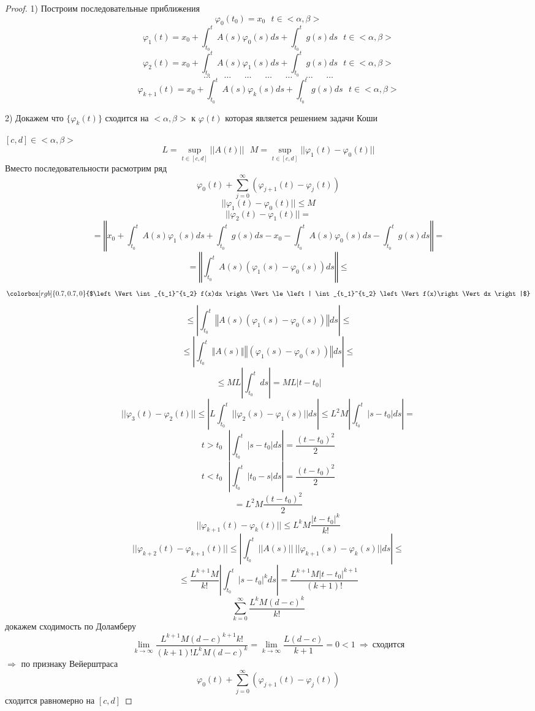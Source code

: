 \begin{proof}
  1) Построим последовательные приближения
  $$
  \varphi_0(t_0) = x_0 ~~~ t \in <\alpha, \beta>
  $$
  $$
  \varphi_1(t) = x_0 + \int_{t_0}^t A(s) \varphi_0(s)ds + \int_{t_0}^t g(s) ds
  ~~~ t \in <\alpha, \beta>
  $$
  $$
  \varphi_2(t) = x_0 + \int_{t_0}^t A(s) \varphi_1(s)ds + \int_{t_0}^t g(s) ds
  ~~~ t \in <\alpha, \beta>
  $$
  $$
  \ldots ~~~~~~~ \ldots ~~~~~~~ \ldots ~~~~~~~ \ldots ~~~~~~~ \ldots
   ~~~~~~~ \ldots ~~~~~~~ \ldots
  $$
  $$
  \varphi_{k+1}(t) = x_0 + \int_{t_0}^t A(s) \varphi_k(s)ds +
  \int_{t_0}^t g(s)ds ~~~ t \in <\alpha, \beta>
  $$

  2) Докажем что $\{\varphi_k(t)\}$ сходится на $<\alpha, \beta>$ к
  $\varphi(t)$ которая является решением задачи Коши

  $[c,d] \in <\alpha, \beta>$
  $$
  L = \sup_{t \in [c,d]} ||A(t)|| ~~~ M = \sup_{t \in [c,d]} ||\varphi_1(t) -
  \varphi_0(t)||
  $$
  Вместо последовательности расмотрим ряд
  $$
  \varphi_0(t) + \sum_{j=0}^{\infty}(\varphi_{j+1}(t) - \varphi_j(t))
  $$
  $$
  ||\varphi_1(t) - \varphi_0(t)|| \le M
  $$
  $$
  ||\varphi_2(t) - \varphi_1(t)|| =
  $$
  $$
  = \left\Vert x_0 + \int_{t_0}^t A(s)\varphi_1(s)ds +
  \int_{t_0}^t g(s)ds - x_0 - \int_{t_0}^t A(s)\varphi_0(s)ds -
  \int_{t_0}^t g(s)ds\right\Vert =
  $$
  $$
  = \left\Vert \int_{t_0}^t A(s)(\varphi_1(s) - \varphi_0(s))ds\right\Vert \le
  $$
  $$
  \colorbox[rgb]{0.7,0.7,0}{$\left\Vert \int_{t_1}^{t_2} f(x)dx \right\Vert
  \le \left| \int_{t_1}^{t_2} \left\Vert f(x)\right\Vert dx \right|$}
  $$
  $$
  \le \left| \int_{t_0}^t \left\Vert A(s)(\varphi_1(s) - \varphi_0(s))
  \right\Vert ds \right| \le
  $$
  $$
  \le \left| \int_{t_0}^t \left\Vert A(s)\right\Vert
  \left\Vert (\varphi_1(s) - \varphi_0(s)) \right\Vert ds \right| \le
  $$
  $$
  \le ML \left| \int_{t_0}^{t} ds \right| = ML|t-t_0|
  $$
  $$
  ||\varphi_3(t) - \varphi_2(t)|| \le \left| L \int_{t_0}^t||\varphi_2(s) -
  \varphi_1(s)||ds \right| \le L^2 M \left| \int_{t_0}^t |s - t_0| ds \right| =
  $$
  $$
  t > t_0 ~~~ \left| \int_{t_0}^t |s - t_0| ds \right| = \frac{(t- t_0)^2}{2}
  $$
  $$
  t < t_0 ~~~ \left| \int_{t_0}^t |t_0 - s| ds \right| = \frac{(t- t_0)^2}{2}
  $$
  $$
  = L^2 M \frac{(t- t_0)^2}{2}
  $$
  $$
  ||\varphi_{k+1}(t) - \varphi_k(t)|| \le L^k M \frac{|t - t_0|^k}{k!}
  $$
  $$
  ||\varphi_{k+2}(t) - \varphi_{k+1}(t)|| \le \left| \int_{t_0}^t ||A(s)|| ~
  ||\varphi_{k+1}(s) - \varphi_k(s)|| ds \right| \le
  $$
  $$
  \le \frac{L^{k+1}M}{k!} \left| \int_{t_0}^t |s - t_0|^k ds \right| =
  \frac{L^{k+1}M|t-t_0|^{k+1}}{(k+1)!}
  $$
  $$
  \sum_{k=0}^{\infty} \frac{L^kM(d - c)^k}{k!}
  $$
  докажем сходимость по Доламберу
  $$
  \lim_{k \to \infty} \frac{L^{k+1} M(d - c)^{k+1}k!}{(k+1)!L^k M (d - c)^k} =
  \lim_{k \to \infty} \frac{L(d-c)}{k+1} = 0 < 1 ~ \Rightarrow ~
  \text{сходится}
  $$
  $\Rightarrow$ по признаку Вейерштраса
  $$
  \varphi_0(t) + \sum_{j=0}^{\infty}(\varphi_{j+1}(t) - \varphi_j(t))
  $$
  сходится равномерно на $[c,d]$


\end{proof}
